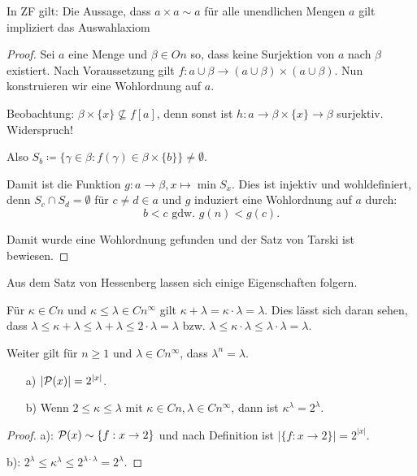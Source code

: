 \begin{satz}[Tarski, 1924]
	In ZF gilt: Die Aussage, dass $a\times a\sim a$ für alle unendlichen Mengen $a$ gilt impliziert das Auswahlaxiom
\end{satz}
\begin{proof}
	Sei $a$ eine Menge und $\beta\in On$ so, dass keine Surjektion von $a$ nach $\beta$ existiert. Nach Voraussetzung gilt $f:a\cup \beta \to (a\cup \beta)\times(a\cup\beta)$. Nun konstruieren wir eine Wohlordnung auf $a$.
	
	Beobachtung: $\beta\times\{x\}\not\subseteq f[a]$, denn sonst ist $h:a\to \beta\times\{x\}\to \beta$ surjektiv. Widerspruch!
	
	Also $S_b\coloneqq\{\gamma\in\beta : f(\gamma)\in\beta\times\{b\}\}\neq\emptyset$.
	
	Damit ist die Funktion $g:a\to\beta, x\mapsto \min S_x$. Dies  ist injektiv und wohldefiniert, denn $S_c\cap S_d=\emptyset$ für $c\neq d\in a$ und $g$ induziert eine Wohlordnung auf $a$ durch:
	$$b<c\text{ gdw. } g(n)<g(c).$$

	Damit wurde eine Wohlordnung gefunden und der Satz von Tarski ist bewiesen.
\end{proof}

Aus dem Satz von Hessenberg lassen sich einige Eigenschaften folgern.

Für $\kappa\in Cn$ und $\kappa\leq\lambda\in Cn^\infty$ gilt $\kappa+\lambda=\kappa\cdot\lambda=\lambda$. 
Dies lässt sich daran sehen, dass $\lambda \leq \kappa+\lambda\leq\lambda+\lambda \leq 2\cdot\lambda =\lambda$ bzw. $\lambda \leq \kappa\cdot\lambda \leq \lambda\cdot\lambda = \lambda$.

Weiter gilt für $n\geq 1$ und $\lambda \in Cn^\infty$, dass $\lambda^n=\lambda$.

\begin{satz}
	\begin{itemize}
		\item[a)] $\vert \mathcal{P}(x) \vert = 2^{\vert x \vert}$.
		\item[b)] Wenn $2\leq \kappa \leq \lambda$ mit $\kappa\in Cn, \lambda\in Cn^\infty$, dann ist $\kappa^\lambda=2^\lambda$.
	\end{itemize}
\end{satz}
\begin{proof}
		a): $\mathcal{P}(x)\sim\{f:x\to2\}$ und nach Definition ist $\vert\{f:x\to 2\}\vert=2^{\vert x \vert}$.
		
		b): $2^\lambda \leq \kappa^\lambda \leq 2^{\lambda\cdot\lambda}=2^\lambda$.
\end{proof}

